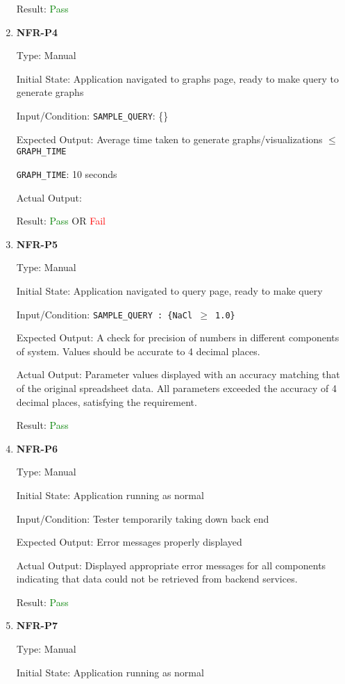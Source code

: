 \documentclass[12pt, titlepage]{article}
\begin{document}
\begin{enumerate}
Result: \textcolor{green}{Pass} 

\item{\textbf{NFR-P4}} \label{NFR:P4}

Type: Manual

Initial State: Application navigated to graphs page, ready to make query to
generate graphs

Input/Condition: \texttt{SAMPLE\_QUERY}: \{\}
  
Expected Output: Average time taken to generate graphs/visualizations $\leq$
\texttt{GRAPH\_TIME}

\texttt{GRAPH\_TIME}: 10 seconds

Actual Output:

Result: \textcolor{green}{Pass} OR \textcolor{red}{Fail}

\item{\textbf{NFR-P5}} \label{NFR:P5}

Type: Manual

Initial State: Application navigated to query page, ready to make query

Input/Condition: \texttt{SAMPLE\_QUERY : \{NaCl $\ge$ 1.0\}}

Expected Output: A check for precision of numbers in different components of
system. Values should be accurate to 4 decimal places.

Actual Output: Parameter values displayed with an accuracy matching that of the
original spreadsheet data. All parameters exceeded the accuracy of 4 decimal
places, satisfying the requirement.

Result: \textcolor{green}{Pass}

\item{\textbf{NFR-P6}} \label{NFR:P6}

Type: Manual

Initial State: Application running as normal

Input/Condition: Tester temporarily taking down back end

Expected Output: Error messages properly displayed

Actual Output: Displayed appropriate error messages for all components
indicating that data could not be retrieved from backend services.

Result: \textcolor{green}{Pass}

\item{\textbf{NFR-P7}} \label{NFR:P7}

Type: Manual

Initial State: Application running as normal


\end{enumerate}
\end{document}
